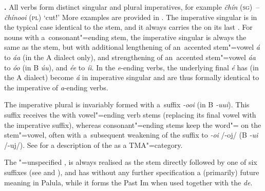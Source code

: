 \textbf{.} All verbs form distinct singular and plural imperatives, for example \textit{čhín} \textsc{(sg)}~-- \textit{čhínooi} (\textsc{pl}) `cut!' More examples are provided in . The imperative singular is in the typical case identical to the  stem, and it always carries the  on its last . For nouns with a~consonant"=ending stem, the imperative singular is always the same as the stem, but with additional lengthening of an~accented stem"=vowel \textit{á} to \textit{áa} (in the A dialect only), and strengthening of an~accented stem"=vowel \textit{áa} to \textit{óo} (in B \textit{úu}), and \textit{ée} to \textit{íi}. In the \textit{e}-ending verbs, the underlying final \textit{é} has (in the A dialect) become \textit{á} in imperative singular and are thus formally identical to the imperative of \textit{a}-ending verbs.

The imperative plural is invariably formed with a~suffix \textit{-ooi} (in B \textit{-uui}). This suffix receives the  with vowel"=ending verb stems (replacing its final vowel with the imperative suffix), whereas consonant"=ending stems keep the word"= on the stem"=vowel, often with a~subsequent weakening of the suffix to \textit{-oi} /-oj/ (B \textit{-ui} /-uj/). See  for a description of the  as a TMA"=category.


 The "=unspecified , is always realised as the
 stem directly followed by one of six  suffixes (see
 and ), and has without any further specification a (primarily) future meaning in Palula, while it forms the Past Im when used together with the  \textit{de}.



